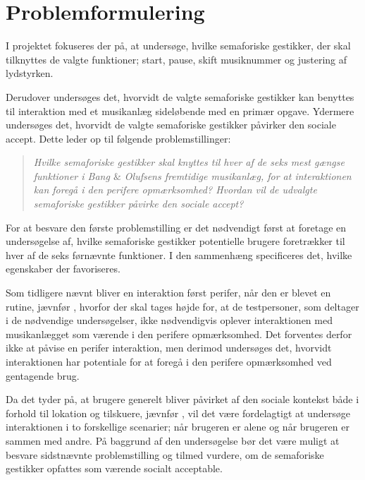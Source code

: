 \section{Problemformulering}
\label{Problemformulering}
%
I projektet fokuseres der på, at undersøge, hvilke semaforiske gestikker, der skal tilknyttes de valgte funktioner; start, pause, skift musiknummer og justering af lydstyrken. 

Derudover undersøges det, hvorvidt de valgte semaforiske gestikker kan benyttes til interaktion med et musikanlæg sideløbende med en primær opgave. Ydermere undersøges det, hvorvidt de valgte semaforiske gestikker påvirker den sociale accept. Dette leder op til følgende problemstillinger:\blankline
%
\begin{quotation}
	\noindent
	\textit{Hvilke semaforiske gestikker skal knyttes til hver af de seks mest gængse funktioner i Bang $\&$ Olufsens fremtidige musikanlæg, for at interaktionen kan foregå i den perifere opmærksomhed?\blankline
		Hvordan vil de udvalgte semaforiske gestikker påvirke den sociale accept?}\blankline
\end{quotation}
%
For at besvare den første problemstilling er det nødvendigt først at foretage en undersøgelse af, hvilke semaforiske gestikker potentielle brugere foretrækker til hver af de seks førnævnte funktioner. I den sammenhæng specificeres det, hvilke egenskaber der favoriseres.

Som tidligere nævnt bliver en interaktion først perifer, når den er blevet en rutine, jævnfør , hvorfor der skal tages højde for, at de testpersoner, som deltager i de nødvendige undersøgelser, ikke nødvendigvis oplever interaktionen med musikanlægget som værende i den perifere opmærksomhed. Det forventes derfor ikke at påvise en perifer interaktion, men derimod undersøges det, hvorvidt interaktionen har potentiale for at foregå i den perifere opmærksomhed ved gentagende brug. 

Da det tyder på, at brugere generelt bliver påvirket af den sociale kontekst både i forhold til lokation og tilskuere, jævnfør , vil det være fordelagtigt at undersøge interaktionen i to forskellige scenarier; når brugeren er alene og når brugeren er sammen med andre. På baggrund af den undersøgelse bør det være muligt at besvare sidstnævnte problemstilling og tilmed vurdere, om de semaforiske gestikker opfattes som værende socialt acceptable. 




